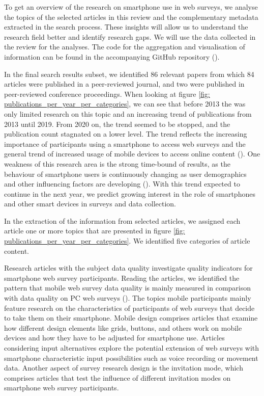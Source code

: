 To get an overview of the research on smartphone use in web surveys, we analyse the topics of the selected articles in this review and the complementary metadata extracted in the search process. These insights will allow us to understand the research field better and identify research gaps. We will use the data collected in the review for the analyses. The code for the aggregation and visualisation of information can be found in the accompanying GitHub repository (\cite{langenbahn_smartphone_2021}). 

In the final search results subset, we identified 86 relevant papers from which 84 articles were published in a peer-reviewed journal, and two were published in peer-reviewed conference proceedings. When looking at figure \ref{fig: publications_per_year_per_categories}, we can see that before 2013 the was only limited research on this topic and an increasing trend of publications from 2013 until 2019. From 2020 on, the trend seemed to be stopped, and the publication count stagnated on a lower level. The trend reflects the increasing importance of participants using a smartphone to access web surveys and the general trend of increased usage of mobile devices to access online content (\cite{weigold_computerized_2021}). One weakness of this research area is the strong time-bound of results, as the behaviour of smartphone users is continuously changing as user demographics and other influencing factors are developing (\cite{brohl_desktop_2018}). With this trend expected to continue in the next year, we predict growing interest in the role of smartphones and other smart devices in surveys and data collection.  

In the extraction of the information from selected articles, we assigned each article one or more topics that are presented in figure \ref{fig: publications_per_year_per_categories}. We identified five categories of article content.

Research articles with the subject data quality investigate quality indicators for smartphone web survey participants. Reading the articles, we identified the pattern that mobile web survey data quality is mainly measured in comparison with data quality on PC web surveys (\cite{de_bruijne_comparing_2013, ha_data_2020}). The topics mobile participants mainly feature research on the characteristics of participants of web surveys that decide to take them on their smartphone. Mobile design comprises articles that examine how different design elements like grids, buttons, and others work on mobile devices and how they have to be adjusted for smartphone use. Articles considering input alternatives explore the potential extension of web surveys with smartphone characteristic input possibilities such as voice recording or movement data. Another aspect of survey research design is the invitation mode, which comprises articles that test the influence of different invitation modes on smartphone web survey participants. 

